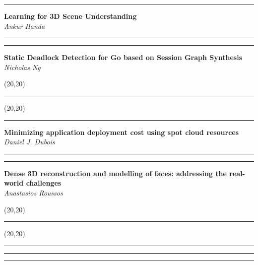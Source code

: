 \documentclass[11pt]{article}
\newcommand{\talk}[1]{\Large\flushleft\textbf{#1}\\}
\newcommand{\speaker}[1]{\textit{#1}\\}
\newcommand{\separator}{\noindent\rule{\linewidth}{0.1mm}}
\newcommand{\votebox}{\noindent\hfill\framebox(20,20){}}
\newcommand{\hstrut}{\noindent\rule{\linewidth}{0pt}}
\begin{document}
\noindent
\begin{minipage}[t]{0.49\linewidth}
\separator%
\talk{Learning for 3D Scene Understanding}
\speaker{Ankur Handa}
\end{minipage}
\begin{minipage}[t]{0.02\linewidth}
\hstrut%
\end{minipage}
\begin{minipage}[t]{0.49\linewidth}
\separator%
\talk{Static Deadlock Detection for Go based on Session Graph Synthesis}
\speaker{Nicholas Ng}
\end{minipage}
\vfill
\noindent
\begin{minipage}[b]{0.49\linewidth}
\votebox%
\end{minipage}
\begin{minipage}[b]{0.02\linewidth}
\hstrut%
\end{minipage}
\begin{minipage}[b]{0.49\linewidth}
\votebox%
\end{minipage}
\noindent
\begin{minipage}[t]{0.49\linewidth}
\separator%
\talk{Minimizing application deployment cost using spot cloud resources}
\speaker{Daniel J. Dubois}
\end{minipage}
\begin{minipage}[t]{0.02\linewidth}
\hstrut%
\end{minipage}
\begin{minipage}[t]{0.49\linewidth}
\separator%
\talk{Dense 3D reconstruction and modelling of faces: addressing the real-world
      challenges}
\speaker{Anastasios Roussos}
\end{minipage}
\vfill
\noindent
\begin{minipage}[b]{0.49\linewidth}
\votebox%
\end{minipage}
\begin{minipage}[b]{0.02\linewidth}
\hstrut%
\end{minipage}
\begin{minipage}[b]{0.49\linewidth}
\votebox%
\end{minipage}
\noindent
\begin{minipage}[t]{0.49\linewidth}
\separator%
\end{minipage}
\begin{minipage}[t]{0.02\linewidth}
\hstrut%
\end{minipage}
\begin{minipage}[t]{0.49\linewidth}
\separator%
\end{minipage}
\end{document}
